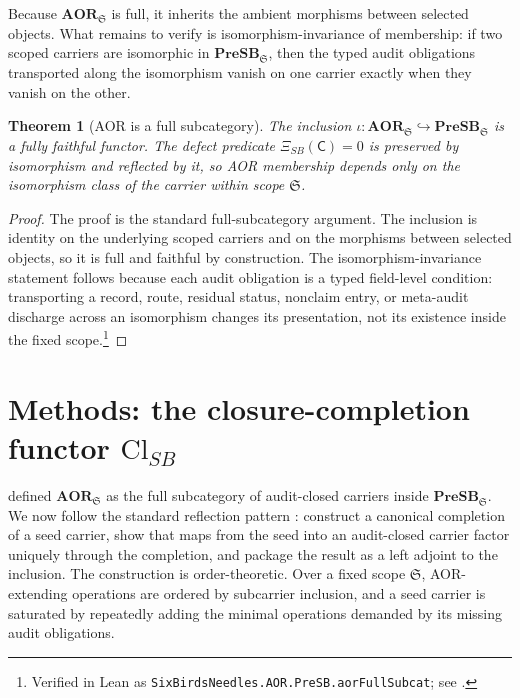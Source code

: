 \documentclass[11pt]{article}
\newcommand{\PreSB}{\mathbf{PreSB}}
\newcommand{\AOR}{\mathbf{AOR}}
\newcommand{\ClSB}{\mathrm{Cl}_{SB}}
\newcommand{\XiSB}{\Xi_{SB}}
\newtheorem{theorem}{Theorem}[section]
\theoremstyle{definition}
\begin{document}
Because \(\AOR_{\mathfrak S}\) is full, it inherits the ambient
morphisms between selected objects.  What remains to verify is
isomorphism-invariance of membership: if two scoped carriers are
isomorphic in \(\PreSB_{\mathfrak S}\), then the typed audit
obligations transported along the isomorphism vanish on one carrier
exactly when they vanish on the other.

\begin{theorem}[AOR is a full subcategory]\label{thm:aor:aor-full-subcat}
The inclusion $\iota:\AOR_{\mathfrak S}\hookrightarrow\PreSB_{\mathfrak S}$
is a fully faithful functor.  The defect predicate $\XiSB(\mathsf C)=0$
is preserved by isomorphism and reflected by it, so AOR membership
depends only on the isomorphism class of the carrier within scope
$\mathfrak S$.
\end{theorem}

\begin{proof}
The proof is the standard full-subcategory argument.  The inclusion is
identity on the underlying scoped carriers and on the morphisms between
selected objects, so it is full and faithful by construction.  The
isomorphism-invariance statement follows because each audit obligation is a
typed field-level condition: transporting a record, route, residual status,
nonclaim entry, or meta-audit discharge across an isomorphism changes its
presentation, not its existence inside the fixed scope.\footnote{Verified in Lean as \texttt{SixBirdsNeedles.AOR.PreSB.aorFullSubcat}; see .}
\end{proof}
 \section{\texorpdfstring{Methods: the closure-completion functor \(\ClSB\)}{Methods: the closure-completion functor ClSB}}\label{sec:aor-methods}

 defined \(\AOR_{\mathfrak S}\) as the
full subcategory of audit-closed carriers inside
\(\PreSB_{\mathfrak S}\).  We now follow the standard reflection
pattern \citep{MacLane1998Categories,Borceux1994CategoricalAlgebra}:
construct a canonical completion of a seed carrier, show that maps
from the seed into an audit-closed carrier factor uniquely through
the completion, and package the result as a left adjoint to the
inclusion.  The construction is order-theoretic.  Over a fixed scope
\(\mathfrak S\), AOR-extending operations are ordered by subcarrier
inclusion, and a seed carrier is saturated by repeatedly adding the
minimal operations demanded by its missing audit obligations.
\end{document}
